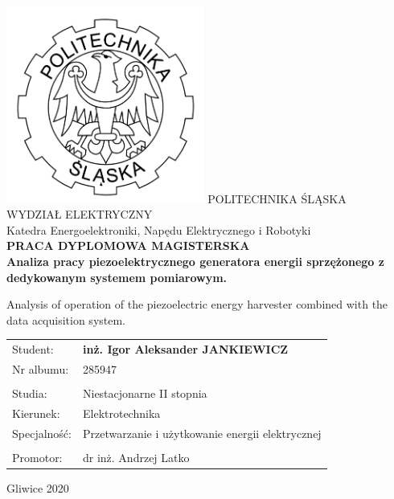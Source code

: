 \documentclass[12pt,a4paper]{article}
\begin{document}
\begin{titlepage}
    \centering
    \includegraphics[width=6.5cm]{logo2.png} %
    \vskip1cm
    {\Large
        POLITECHNIKA ŚLĄSKA\\
        WYDZIAŁ ELEKTRYCZNY\\
        \vskip0.5cm
        Katedra Energoelektroniki, Napędu Elektrycznego i Robotyki\\
    }
    \vskip1cm
    {\bfseries\huge
    PRACA DYPLOMOWA MAGISTERSKA\\
    }
    \vskip0.5cm
    {\bfseries\large
    Analiza pracy piezoelektrycznego generatora energii sprzężonego z dedykowanym systemem pomiarowym. \\
    }

        \vskip0.5cm
    {\bfseries\normalsize
    
Analysis of operation of the piezoelectric energy harvester combined with the data acquisition system. \\
    }
        \vskip 1.5cm
    {\large
    \begin{tabular}{p{4cm} p{10cm}}
    Student: & {\bfseries\Large inż. Igor Aleksander JANKIEWICZ}\\
    Nr albumu: & 285947\\
        &   \\
    Studia: & Niestacjonarne II stopnia\\
    Kierunek: & Elektrotechnika\\
    Specjalność: & Przetwarzanie i użytkowanie energii elektrycznej\\
        &   \\
    Promotor: & dr inż. Andrzej Latko\\
    \end{tabular}
    }
    \vskip2cm
    {\large
    Gliwice 2020}
\end{titlepage}

\clearpage
\end{document}

